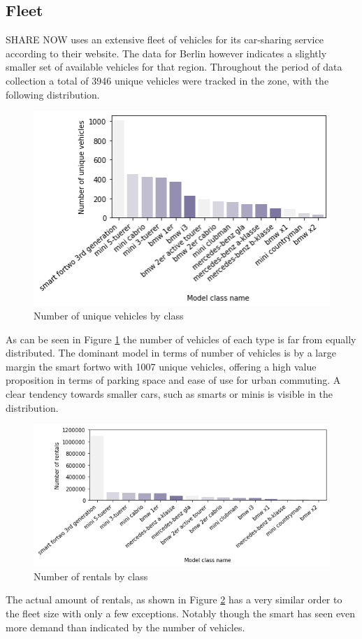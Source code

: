 \subsection{Fleet}
\label{sub_sec:CaseStudy/Fleet}

SHARE NOW uses an extensive fleet of vehicles for its car-sharing service according to their website. The data
for Berlin however indicates a slightly smaller set of available vehicles for that region. Throughout the
period of data collection a total of 3946 unique vehicles were tracked in the zone, with the following
distribution.

\begin{figure}[htbp]
  \centering
  \includegraphics[width=.4\linewidth]{./Figures/fleet.png}
  \caption{Number of unique vehicles by class}
  \label{fig:Fleet}
\end{figure}

As can be seen in Figure \ref{fig:Fleet} the number of vehicles of each type is far from equally distributed.
The dominant model in terms of number of vehicles is by a large margin the smart fortwo with 1007 unique vehicles, 
offering a high value proposition
in terms of parking space and ease of use for urban commuting. A clear tendency towards smaller cars, such as smarts
or minis is visible in the distribution.

\begin{figure}[htbp]
  \centering
  \includegraphics[width=.4\linewidth]{./Figures/travels.png}
  \caption{Number of rentals by class}
  \label{fig:Rentals}
\end{figure}

The actual amount of rentals, as shown in Figure \ref{fig:Rentals} has a very similar order to the fleet size 
with only a few exceptions. Notably though the smart has
seen even more demand than indicated by the number of vehicles.

